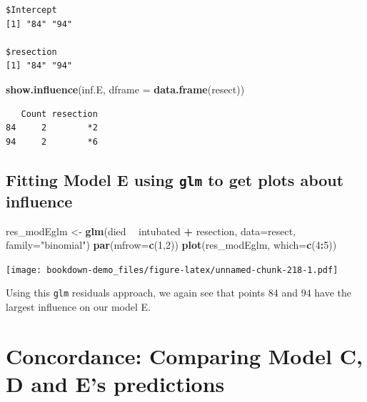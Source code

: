 \documentclass[]{book}
\newenvironment{Shaded}{\begin{snugshade}}{\end{snugshade}}
\newcommand{\KeywordTok}[1]{\textcolor[rgb]{0.13,0.29,0.53}{\textbf{#1}}}
\newcommand{\DataTypeTok}[1]{\textcolor[rgb]{0.13,0.29,0.53}{#1}}
\newcommand{\DecValTok}[1]{\textcolor[rgb]{0.00,0.00,0.81}{#1}}
\newcommand{\StringTok}[1]{\textcolor[rgb]{0.31,0.60,0.02}{#1}}
\newcommand{\OperatorTok}[1]{\textcolor[rgb]{0.81,0.36,0.00}{\textbf{#1}}}
\newcommand{\NormalTok}[1]{#1}
\theoremstyle{definition}
\theoremstyle{definition}
\theoremstyle{definition}
\theoremstyle{remark}
\begin{document}
\begin{verbatim}
$Intercept
[1] "84" "94"

$resection
[1] "84" "94"
\end{verbatim}

\begin{Shaded}
\begin{Highlighting}[]
\KeywordTok{show.influence}\NormalTok{(inf.E, }\DataTypeTok{dframe =} \KeywordTok{data.frame}\NormalTok{(resect))}
\end{Highlighting}
\end{Shaded}

\begin{verbatim}
   Count resection
84     2        *2
94     2        *6
\end{verbatim}

\subsection{\texorpdfstring{Fitting Model E using \texttt{glm} to get
plots about
influence}{Fitting Model E using glm to get plots about influence}}\label{fitting-model-e-using-glm-to-get-plots-about-influence}

\begin{Shaded}
\begin{Highlighting}[]
\NormalTok{res_modEglm <-}\StringTok{ }\KeywordTok{glm}\NormalTok{(died }\OperatorTok{~}\StringTok{ }\NormalTok{intubated }\OperatorTok{+}\StringTok{ }\NormalTok{resection, }
                  \DataTypeTok{data=}\NormalTok{resect, }\DataTypeTok{family=}\StringTok{"binomial"}\NormalTok{)}
\KeywordTok{par}\NormalTok{(}\DataTypeTok{mfrow=}\KeywordTok{c}\NormalTok{(}\DecValTok{1}\NormalTok{,}\DecValTok{2}\NormalTok{))}
\KeywordTok{plot}\NormalTok{(res_modEglm, }\DataTypeTok{which=}\KeywordTok{c}\NormalTok{(}\DecValTok{4}\OperatorTok{:}\DecValTok{5}\NormalTok{))}
\end{Highlighting}
\end{Shaded}

\texttt{[image: bookdown-demo\_files/figure-latex/unnamed-chunk-218-1.pdf]}

Using this \texttt{glm} residuals approach, we again see that points 84
and 94 have the largest influence on our model E.

\section{Concordance: Comparing Model C, D and E's
predictions}\label{concordance-comparing-model-c-d-and-es-predictions}
\end{document}
